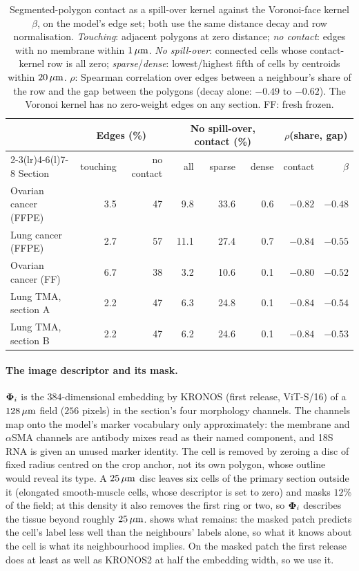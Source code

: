 \begin{table}[!htbp]
\centering
\caption{Segmented-polygon contact as a spill-over kernel against the Voronoi-face kernel $\beta$, on the model's edge set; both use the same distance decay and row normalisation. \emph{Touching}: adjacent polygons at zero distance; \emph{no contact}: edges with no membrane within $1\,\mu\text{m}$. \emph{No spill-over}: connected cells whose contact-kernel row is all zero; \emph{sparse}/\emph{dense}: lowest/highest fifth of cells by centroids within $20\,\mu\text{m}$. $\rho$: Spearman correlation over edges between a neighbour's share of the row and the gap between the polygons (decay alone: $-0.49$ to $-0.62$). The Voronoi kernel has no zero-weight edges on any section. FF: fresh frozen.}
\label{tab:contact}
\small
\setlength{\tabcolsep}{4pt}
\begin{tabular}{@{}lrrrrrrr@{}}
\toprule
& \multicolumn{2}{c}{Edges (\%)} & \multicolumn{3}{c}{No spill-over, contact (\%)} & \multicolumn{2}{c}{$\rho$(share, gap)} \\
\cmidrule(lr){2-3}\cmidrule(lr){4-6}\cmidrule(l){7-8}
Section & touching & no contact & all & sparse & dense & contact & $\beta$ \\
\midrule
Ovarian cancer (FFPE) & 3.5 & 47 & 9.8 & 33.6 & 0.6 & $-0.82$ & $-0.48$ \\
Lung cancer (FFPE) & 2.7 & 57 & 11.1 & 27.4 & 0.7 & $-0.84$ & $-0.55$ \\
Ovarian cancer (FF) & 6.7 & 38 & 3.2 & 10.6 & 0.1 & $-0.80$ & $-0.52$ \\
Lung TMA, section A & 2.2 & 47 & 6.3 & 24.8 & 0.1 & $-0.84$ & $-0.54$ \\
Lung TMA, section B & 2.2 & 47 & 6.2 & 24.6 & 0.1 & $-0.84$ & $-0.53$ \\
\bottomrule
\end{tabular}
\end{table}

\paragraph{The image descriptor and its mask.}
\label{app:image}
$\boldsymbol{\Phi}_i$ is the $384$-dimensional embedding by KRONOS \citep{kronos2025} (first release, ViT-S/16) of a $128\,\mu\text{m}$ field ($256$ pixels) in the section's four morphology channels. The channels map onto the model's marker vocabulary only approximately: the membrane and $\alpha$SMA channels are antibody mixes read as their named component, and 18S RNA is given an unused marker identity. The cell is removed by zeroing a disc of fixed radius centred on the crop anchor, not its own polygon, whose outline would reveal its type. A $25\,\mu\text{m}$ disc leaves six cells of the primary section outside it (elongated smooth-muscle cells, whose descriptor is set to zero) and masks $12\%$ of the field; at this density it also removes the first ring or two, so $\boldsymbol{\Phi}_i$ describes the tissue beyond roughly $25\,\mu\text{m}$.  shows what remains: the masked patch predicts the cell's label less well than the neighbours' labels alone, so what it knows about the cell is what its neighbourhood implies. On the masked patch the first release does at least as well as KRONOS2 at half the embedding width, so we use it.

